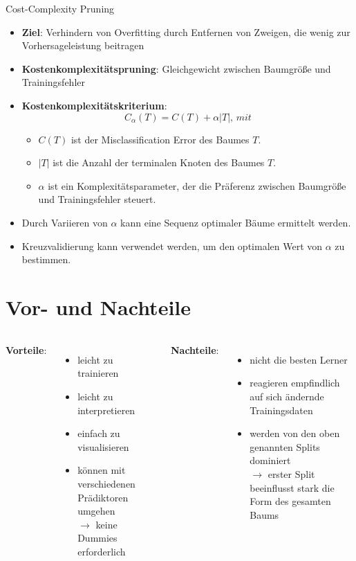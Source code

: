 \documentclass{beamer}
\begin{document}
\begin{frame}{Cost-Complexity Pruning}
	\begin{itemize}
		\item {\textbf{Ziel}: Verhindern von Overfitting durch Entfernen von Zweigen, die wenig zur Vorhersageleistung beitragen}
		\item {\textbf{Kostenkomplexitätspruning}: Gleichgewicht zwischen Baumgröße und Trainingsfehler}
		\item \textbf{Kostenkomplexitätskriterium}: \[C_{\alpha}(T) = C(T) + \alpha|T|, \, mit\]
		\begin{itemize}
			\item $C(T)$ ist der Misclassification Error des Baumes $T$.
			\item $|T|$ ist die Anzahl der terminalen Knoten des Baumes $T$.
			\item $\alpha$ ist ein Komplexitätsparameter, der die Präferenz zwischen Baumgröße und Trainingsfehler steuert.
		\end{itemize}
		\item Durch Variieren von $\alpha$ kann eine Sequenz optimaler Bäume ermittelt werden.
		\item Kreuzvalidierung kann verwendet werden, um den optimalen Wert von $\alpha$ zu bestimmen.
	\end{itemize}
\end{frame}



\section{Vor- und Nachteile}

\begin{frame}
	\begin{columns}[T, onlytextwidth]
			\textbf{Vorteile}:
			\begin{itemize}
				\item leicht zu trainieren
				\item leicht zu interpretieren
				\item einfach zu visualisieren
				\item können mit verschiedenen Prädiktoren umgehen \\$\rightarrow$ keine Dummies erforderlich
			\end{itemize}
		
			\textbf{Nachteile}:
			\begin{itemize}
				\item nicht die besten Lerner
				\item reagieren empfindlich auf sich ändernde Trainingsdaten
				\item werden von den oben genannten Splits dominiert \\$\rightarrow$ erster Split beeinflusst stark die Form des gesamten Baums
			\end{itemize}
	\end{columns}
\end{frame}
\end{document}
